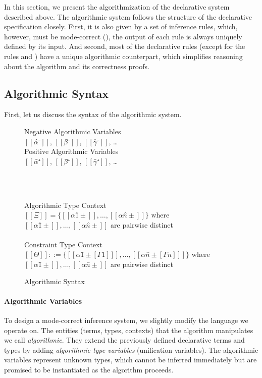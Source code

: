 \label{sec:algorithm}

In this section, we present the algorithmization of the declarative system described above.
The algorithmic system follows the structure of the declarative specification closely.
First, it is also given by a set of inference rules, which, however,
must be mode-correct (\cite{dunfield2020:bidirectional}), \ie
the output of each rule is always uniquely defined by its input.
And second, most of the declarative rules 
(except for the rules  and )
have a unique algorithmic counterpart, 
which simplifies reasoning about the algorithm and its correctness proofs.


\subsection{Algorithmic Syntax}
\label{sec:algo-syntax}

First, let us discuss the syntax of the algorithmic system. 

\begin{figure}[h]
  \begin{multicols}{2}
      Negative Algorithmic Variables\\
      $[[α̂⁻]]$, $[[β̂⁻]]$, $[[γ̂⁻]]$, \dots\\
      \columnbreak
      Positive Algorithmic Variables\\
      $[[α̂⁺]]$, $[[β̂⁺]]$, $[[γ̂⁺]]$, \dots\\
  \end{multicols}
  \hfill\\
  \begin{multicols}{2}
      \ottuNShort
      \columnbreak
      \ottuPShort
  \end{multicols}
  \hfill\\
  Algorithmic Type Context\\
   $[[Ξ]] = \{[[α1̂±]], \dots, [[αn̂±]]\}$ where $[[α1̂±]], \dots, [[αn̂±]]$ are pairwise distinct \\
  \hfill\\
  Constraint Type Context\\
   $[[Θ]] ::= \{[[ α1̂±[Γ1] ]], \dots, [[ αn̂±[Γn] ]]\}$ where $[[α1̂±]], \dots, [[αn̂±]]$ are pairwise distinct \\
  \caption{Algorithmic Syntax}
  \label{fig:algo-syntax}
\end{figure}

\paragraph{Algorithmic Variables}
To design a mode-correct inference system, we slightly modify the language we operate on.
The entities (terms, types, contexts) that the algorithm manipulates we call \emph{algorithmic}. 
They extend the previously defined declarative terms and types by adding 
\emph{algorithmic type variables} (\aka unification variables). 
The algorithmic variables represent unknown types, 
which cannot be inferred immediately but are promised to be instantiated
as the algorithm proceeds.

